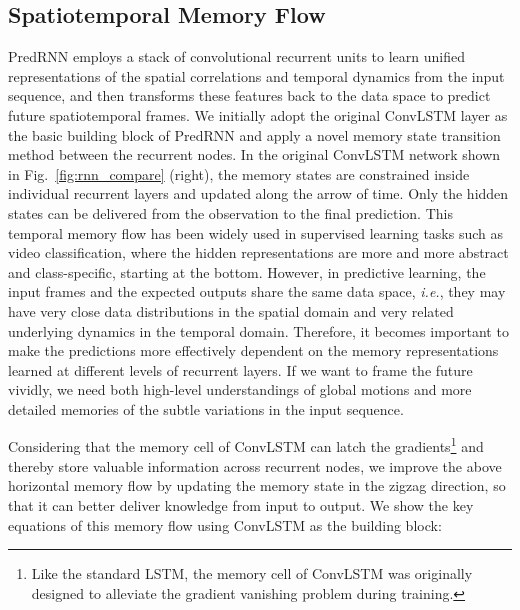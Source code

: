 \documentclass[10pt,journal,compsoc]{IEEEtran}
\newcommand{\fig}[1]{Fig.~\ref{#1}}
\begin{document}
\subsection{Spatiotemporal Memory Flow}

PredRNN employs a stack of convolutional recurrent units to learn unified representations of the spatial correlations and temporal dynamics from the input sequence, and then transforms these features back to the data space to predict future spatiotemporal frames. 
We initially adopt the original ConvLSTM layer as the basic building block of PredRNN and apply a novel memory state transition method between the recurrent nodes.
In the original ConvLSTM network \cite{shi2015convolutional} shown in \fig{fig:rnn_compare} (right), the memory states  are constrained inside individual recurrent layers and updated along the arrow of time. 
Only the hidden states  can be delivered from the observation to the final prediction.
This temporal memory flow has been widely used in supervised learning tasks such as video classification, where the hidden representations are more and more abstract and class-specific, starting at the bottom.
However, in predictive learning, the input frames and the expected outputs share the same data space, \emph{i.e.}, they may have very close data distributions in the spatial domain and very related underlying dynamics in the temporal domain.
Therefore, it becomes important to make the predictions more effectively dependent on the memory representations learned at different levels of recurrent layers. 
If we want to frame the future vividly, we need both high-level understandings of global motions and more detailed memories of the subtle variations in the input sequence. 


Considering that the memory cell of ConvLSTM can latch the gradients\footnote{Like the standard LSTM, the memory cell of ConvLSTM was originally designed to alleviate the gradient vanishing problem during training.} and thereby store valuable information across recurrent nodes, we improve the above horizontal memory flow by updating the memory state in the zigzag direction, so that it can better deliver knowledge from input to output. 
We show the key equations of this memory flow using ConvLSTM as the building block:
\end{document}
